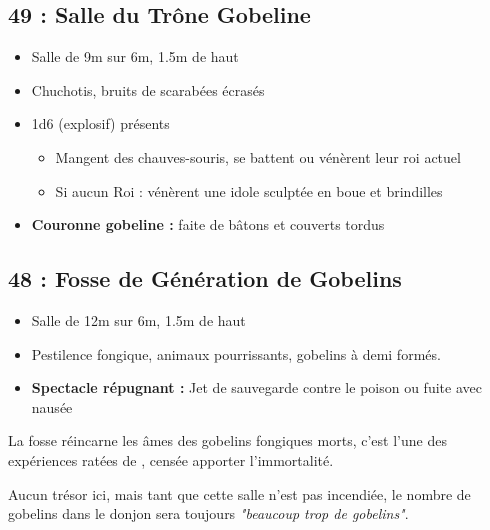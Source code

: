\subsection{49 : Salle du Trône Gobeline}\label{n3:s49}
\begin{itemize}
  \item Salle de 9m sur 6m, 1.5m de haut 
  \item Chuchotis, bruits de scarabées écrasés
  \item 1d6 (explosif) \textbf{} présents
  \begin{itemize}
    \item Mangent des chauves-souris, se battent ou vénèrent leur roi actuel
    \item Si aucun Roi : vénèrent une idole sculptée en boue et brindilles
  \end{itemize}
  \item \textbf{Couronne gobeline :} faite de bâtons et couverts tordus
\end{itemize}

\vfill
\pagebreak

\subsection{48 : Fosse de Génération de Gobelins}\label{n3:s48}
\begin{itemize}
  \item Salle de 12m sur 6m, 1.5m de haut 
  \item Pestilence fongique, animaux pourrissants, gobelins à demi formés.
  \item \textbf{Spectacle répugnant :} Jet de sauvegarde contre le poison ou fuite avec nausée
\end{itemize}

La fosse réincarne les âmes des gobelins fongiques morts, c’est l’une des expériences ratées de 
\textbf{}, censée apporter l’immortalité.

Aucun trésor ici, mais tant que cette salle n’est pas incendiée, le nombre de gobelins dans le donjon sera toujours \emph{"beaucoup trop de gobelins"}.

